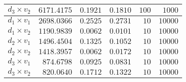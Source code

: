 \begin{tabular}{lrrrrr}
   $d_3 \times v_2$ &                  $6171.4175$ &                        $0.1921$ &                         $0.1810$ &                   $100$ &                  $1000$ \\
   \midrule
   $d_1 \times v_1$ &                  $2698.0366$ &                        $0.2525$ &                         $0.2731$ &                    $10$ &                 $10000$ \\
   $d_1 \times v_2$ &                  $1190.9839$ &                        $0.0062$ &                         $0.0101$ &                    $10$ &                 $10000$ \\
   $d_2 \times v_1$ &                  $1496.4504$ &                        $0.1325$ &                         $0.1052$ &                    $10$ &                 $10000$ \\
   $d_2 \times v_2$ &                  $1418.3957$ &                        $0.0062$ &                         $0.0172$ &                    $10$ &                 $10000$ \\
   $d_3 \times v_1$ &                   $874.6798$ &                        $0.0925$ &                         $0.0831$ &                    $10$ &                 $10000$ \\
   $d_3 \times v_2$ &                   $820.0640$ &                        $0.1712$ &                         $0.1322$ &                    $10$ &                 $10000$ \\
  \bottomrule
\end{tabular}
